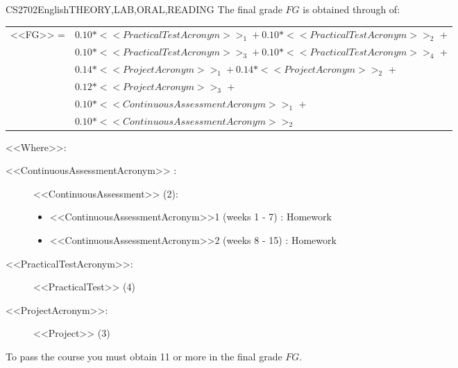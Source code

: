   \begin{evaluation}{CS2702}{English}{THEORY,LAB,ORAL,READING}
  The final grade $FG$ is obtained through of:
  
  \begin{tabular}{cl}
    <<FG>> = & $0.10*<<PracticalTestAcronym>>_{1} + 0.10*<<PracticalTestAcronym>>_{2}$ + \\
             & $0.10*<<PracticalTestAcronym>>_{3} + 0.10*<<PracticalTestAcronym>>_{4}$ + \\
             & $0.14*<<ProjectAcronym>>_{1} + 0.14*<<ProjectAcronym>>_{2}$ + \\
             & $0.12*<<ProjectAcronym>>_{3}$ +\\
             & $0.10*<<ContinuousAssessmentAcronym>>_{1}$ +\\
             & $0.10*<<ContinuousAssessmentAcronym>>_{2}$
  \end{tabular}
  
  \noindent <<Where>>:
  \begin{description}
  \item[<<ContinuousAssessmentAcronym>> :] <<ContinuousAssessment>> (2):
  \begin{itemize}
              \item  <<ContinuousAssessmentAcronym>>1 (weeks 1 - 7)  : Homework
              \item <<ContinuousAssessmentAcronym>>2 (weeks 8 - 15) : Homework
          \end{itemize}
      \item[<<PracticalTestAcronym>>:] <<PracticalTest>> (4)
      \item[<<ProjectAcronym>>:] <<Project>> (3)    
  \end{description}
  \noindent To pass the course you must obtain 11 or more in the final grade $FG$.
  \end{evaluation}
 

